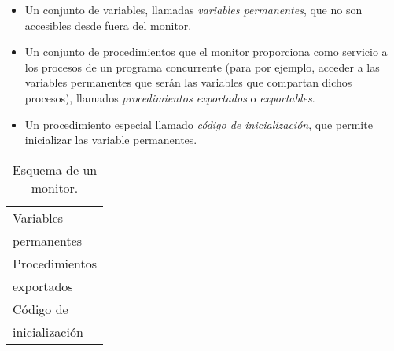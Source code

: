 \begin{itemize}
    \item Un conjunto de variables, llamadas \textit{variables permanentes}, que no son accesibles desde fuera del monitor.
    \item Un conjunto de procedimientos que el monitor proporciona como servicio a los procesos de un programa concurrente (para por ejemplo, acceder a las variables permanentes que serán las variables que compartan dichos procesos), llamados \textit{procedimientos exportados} o \textit{exportables}.
    \item Un procedimiento especial llamado \textit{código de inicialización}, que permite inicializar las variable permanentes.
\end{itemize}

\begin{table}[H]
\centering
\begin{tabular}{|l|}
\hline
Variables \\
permanentes \\
\hline
Procedimientos \\
exportados \\
\hline
Código de \\ 
inicialización \\
\hline
\end{tabular}
\caption{Esquema de un monitor.}
\label{esq:monitor_1}
\end{table}

